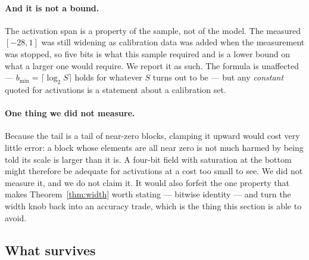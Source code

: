 \documentclass[11pt]{article}
\theoremstyle{definition}
\begin{document}
\paragraph{And it is not a bound.} The activation span is a property of the
sample, not of the model. The measured $[-28,1]$ was still widening as
calibration data was added when the measurement was stopped, so five bits is
what this sample required and is a lower bound on what a larger one would
require. We report it as such. The formula is unaffected --- $b_{\min} = \lceil \log_2 S
\rceil$ holds for whatever $S$ turns out to be --- but any \emph{constant}
quoted for activations is a statement about a calibration set.

\paragraph{One thing we did not measure.} Because the tail is a tail of
near-zero blocks, clamping it upward would cost very little error: a block whose
elements are all near zero is not much harmed by being told its scale is larger
than it is. A four-bit field with saturation at the bottom might therefore be
adequate for activations at a cost too small to see. We did not measure it, and
we do not claim it. It would also forfeit the one property that makes
Theorem~\ref{thm:width} worth stating --- bitwise identity --- and turn the
width knob back into an accuracy trade, which is the thing this section is able
to avoid.

\subsection{What survives}
\label{sec:widthsurvives}
\end{document}

